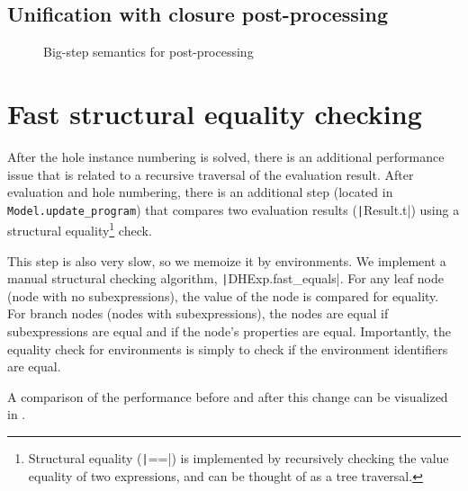 \subsection{Unification with closure post-processing}
\label{sec:unification-postprocessing}

\begin{figure}
  \centering
  \begin{mdframed}
    \begin{singlespace}
      
    \end{singlespace}
  \end{mdframed}
  \caption{Big-step semantics for post-processing}
  \label{fig:big-step-postprocessing-rules}
\end{figure}

\section{Fast structural equality checking}
\label{sec:fast-equals}

After the hole instance numbering is solved, there is an additional performance issue that is related to a recursive traversal of the evaluation result. After evaluation and hole numbering, there is an additional step (located in \texttt{Model.update_program}) that compares two evaluation results (\texttt|Result.t|) using a structural equality\footnote{Structural equality (\texttt|==|) is implemented by recursively checking the value equality of two expressions, and can be thought of as a tree traversal.} check.

This step is also very slow, so we memoize it by environments. We implement a manual structural checking algorithm, \texttt|DHExp.fast_equals|. For any leaf node (node with no subexpressions), the value of the node is compared for equality. For branch nodes (nodes with subexpressions), the nodes are equal if subexpressions are equal and if the node's properties are equal. Importantly, the equality check for environments is simply to check if the environment identifiers are equal.

A comparison of the performance before and after this change can be visualized in .


